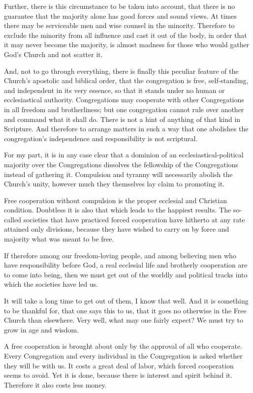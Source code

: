 Further, there is this circumstance to be taken into account, that there is no guarantee that the majority alone has good forces and sound views. At times there may be serviceable men and wise counsel in the minority. Therefore to exclude the minority from all influence and cast it out of the body, in order that it may never become the majority, is almost madness for those who would gather God’s Church and not scatter it.

And, not to go through everything, there is finally this peculiar feature of the Church’s apostolic and biblical order, that the congregation is free, self-standing, and independent in its very essence, so that it stands under no human or ecclesiastical authority. Congregations may cooperate with other Congregations in all freedom and brotherliness; but one congregation cannot rule over another and command what it shall do. There is not a hint of anything of that kind in Scripture. And therefore to arrange matters in such a way that one abolishes the congregation’s independence and responsibility is not scriptural.

For my part, it is in any case clear that a dominion of an ecclesiastical-political majority over the Congregations dissolves the fellowship of the Congregations instead of gathering it. Compulsion and tyranny will necessarily abolish the Church’s unity, however much they themselves lay claim to promoting it.

Free cooperation without compulsion is the proper ecclesial and Christian condition. Doubtless it is also that which leads to the happiest results. The so-called societies that have practiced forced cooperation have hitherto at any rate attained only divisions, because they have wished to carry on by force and majority what was meant to be free.

If therefore among our freedom-loving people, and among believing men who have responsibility before God, a real ecclesial life and brotherly cooperation are to come into being, then we must get out of the worldly and political tracks into which the societies have led us.

It will take a long time to get out of them, I know that well. And it is something to be thankful for, that one says this to us, that it goes no otherwise in the Free Church than elsewhere. Very well, what may one fairly expect? We must try to grow in age and wisdom.

A free cooperation is brought about only by the approval of all who cooperate. Every Congregation and every individual in the Congregation is asked whether they will be with us. It costs a great deal of labor, which forced cooperation seems to avoid. Yet it is done, because there is interest and spirit behind it. Therefore it also costs less money.

